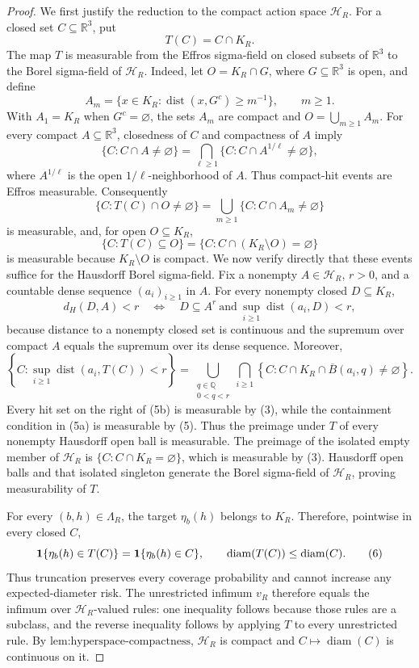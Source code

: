 \documentclass{article}
\begin{document}
\begin{proof}
We first justify the reduction to the compact action space \(\mathcal H_R\).  For a closed set \(C\subseteq\mathbb R^3\), put
\[
 T(C)=C\cap K_R.
\tag{2}
\]
The map \(T\) is measurable from the Effros sigma-field on closed subsets of \(\mathbb R^3\) to the Borel sigma-field of \(\mathcal H_R\).  Indeed, let \(O=K_R\cap G\), where \(G\subseteq\mathbb R^3\) is open, and define
\[
 A_m=\{x\in K_R:\operatorname{dist}(x,G^c)\ge m^{-1}\},\qquad m\ge1.
\]
With \(A_1=K_R\) when \(G^c=\varnothing\), the sets \(A_m\) are compact and \(O=\bigcup_{m\ge1}A_m\).  For every compact \(A\subseteq\mathbb R^3\), closedness of \(C\) and compactness of \(A\) imply
\[
 \{C:C\cap A\ne\varnothing\}
 =\bigcap_{\ell\ge1}\{C:C\cap A^{1/\ell}\ne\varnothing\},
\tag{3}
\]
where \(A^{1/\ell}\) is the open \(1/\ell\)-neighborhood of \(A\).  Thus compact-hit events are Effros measurable.  Consequently
\[
 \{C:T(C)\cap O\ne\varnothing\}
 =\bigcup_{m\ge1}\{C:C\cap A_m\ne\varnothing\}
\tag{4}
\]
is measurable, and, for open \(O\subseteq K_R\),
\[
 \{C:T(C)\subseteq O\}
 =\{C:C\cap(K_R\setminus O)=\varnothing\}
\tag{5}
\]
is measurable because \(K_R\setminus O\) is compact.  We now verify directly that these events suffice for the Hausdorff Borel sigma-field.  Fix a nonempty \(A\in\mathcal H_R\), \(r>0\), and a countable dense sequence \((a_i)_{i\ge1}\) in \(A\).  For every nonempty closed \(D\subseteq K_R\),
\[
 d_H(D,A)<r
 \quad\Longleftrightarrow\quad
 D\subseteq A^r
 \ \text{and}\ 
 \sup_{i\ge1}\operatorname{dist}(a_i,D)<r,
\tag{5a}
\]
because distance to a nonempty closed set is continuous and the supremum over compact \(A\) equals the supremum over its dense sequence.  Moreover,
\[
 \left\{C:\sup_{i\ge1}\operatorname{dist}(a_i,T(C))<r\right\}
 =\bigcup_{\substack{q\in\mathbb Q\\0<q<r}}
   \bigcap_{i\ge1}
   \left\{C:C\cap K_R\cap\overline B(a_i,q)\ne\varnothing\right\}.
\tag{5b}
\]
Every hit set on the right of (5b) is measurable by (3), while the containment condition in (5a) is measurable by (5).  Thus the preimage under \(T\) of every nonempty Hausdorff open ball is measurable.  The preimage of the isolated empty member of \(\mathcal H_R\) is \(\{C:C\cap K_R=\varnothing\}\), which is measurable by (3).  Hausdorff open balls and that isolated singleton generate the Borel sigma-field of \(\mathcal H_R\), proving measurability of \(T\).

For every \((b,h)\in\Lambda_R\), the target \(\eta_b(h)\) belongs to \(K_R\).  Therefore, pointwise in every closed \(C\),
\[
 {\bf1}\{\eta_b(h)\in T(C)\}={\bf1}\{\eta_b(h)\in C\},
 \qquad
 \operatorname{diam}(T(C))\le\operatorname{diam}(C).
\tag{6}
\]
Thus truncation preserves every coverage probability and cannot increase any expected-diameter risk.  The unrestricted infimum \(v_R\) therefore equals the infimum over \(\mathcal H_R\)-valued rules: one inequality follows because those rules are a subclass, and the reverse inequality follows by applying \(T\) to every unrestricted rule.  By \(\text{lem:hyperspace-compactness}\), \(\mathcal H_R\) is compact and \(C\mapsto\operatorname{diam}(C)\) is continuous on it.


\end{proof}
\end{document}
